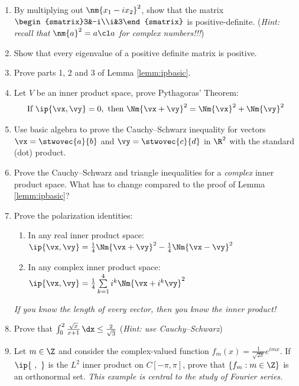 \begin{exercises}
\begin{enumerate}
  \item\label{exs:complexposdef} By multiplying out $\nm{x_1-ix_2}^2$, show that the matrix $\begin{smatrix}3&-i\\i&3\end{smatrix}$ is positive-definite.\smallbreak
  (\emph{Hint: recall that $\nm{a}^2=a\cl a$ for complex numbers!!!})
  \goodbreak
  
  \item Show that every eigenvalue of a positive definite matrix is positive.
  
  \item Prove parts 1, 2 and 3 of Lemma \ref{lemm:ipbasic}.
  
  \item\label{ex:pythag} Let $V$ be an inner product space, prove Pythagoras' Theorem:
  \[\text{If }\ip{\vx,\vy}=0,\text{ then }\Nm{\vx+\vy}^2=\Nm{\vx}^2+\Nm{\vy}^2\]
  
	\item Use basic algebra to prove the Cauchy--Schwarz inequality for vectors $\vx=\stwovec{a}{b}$ and $\vy=\stwovec{c}{d}$ in $\R^2$ with the standard (dot) product.
	
	\item Prove the Cauchy--Schwarz and triangle inequalities for a \emph{complex} inner product space. What has to change compared to the proof of Lemma \ref{lemm:ipbasic}?
	
	\item Prove the polarization identities:
	\begin{enumerate}
	  \item In any real inner product space: $\ip{\vx,\vy}=\frac 14\Nm{\vx+\vy}^2 -\frac 14\Nm{\vx-\vy}^2$
	  \item In any complex inner product space: $\ip{\vx,\vy}=\frac 14\sum\limits_{k=1}^4i^k\Nm{\vx+i^k\vy}^2$
	\end{enumerate}
	\emph{If you know the length of every vector, then you know the inner product!}
	
	\item Prove that $\int_0^2\frac{\sqrt x}{x+1}\,\dx\le \frac 2{\sqrt 3}$\smallbreak
	(\emph{Hint: use Cauchy--Schwarz})

  
  \item\label{ex:fourier} Let $m\in\Z$ and consider the complex-valued function $f_m(x)=\frac 1{\sqrt{2\pi}}e^{i mx}$. If $\ip{\ ,\ }$ is the $L^2$ inner product on $C[-\pi,\pi]$, prove that $\{f_m:m\in\Z\}$ is an orthonormal set.\smallbreak
  \emph{This example is central to the study of \emph{Fourier series.}}
  

\end{enumerate}
\end{exercises}
